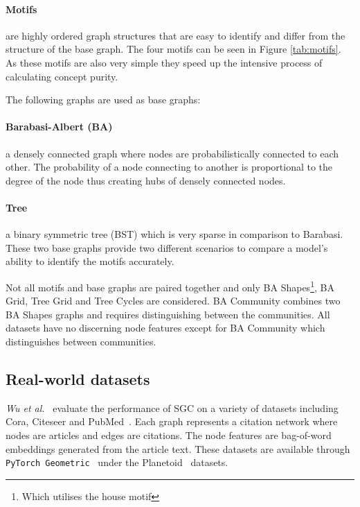 \paragraph{Motifs}

are highly ordered graph structures that are easy to identify and differ from the structure of the base graph.
The four motifs can be seen in Figure \ref{tab:motifs}.
As these motifs are also very simple they speed up the intensive process of calculating concept purity.

The following graphs are used as base graphs:

\paragraph{Barabasi-Albert (BA)}
a densely connected graph where nodes are probabilistically connected to each other.
The probability of a node connecting to another is proportional to the degree of the node thus creating hubs of densely connected nodes.

\paragraph{Tree}
a binary symmetric tree (BST) which is very sparse in comparison to Barabasi.
These two base graphs provide two different scenarios to compare a model's ability to identify the motifs accurately.

Not all motifs and base graphs are paired together and only BA Shapes\footnote{Which utilises the house motif}, BA Grid, Tree Grid and Tree Cycles are considered.
BA Community combines two BA Shapes graphs and requires distinguishing between the communities.
All datasets have no discerning node features except for BA Community which distinguishes between communities.

\subsection{Real-world datasets}
\label{sec:RWD}


\textit{Wu et al.}~\cite{wu2019simplifying} evaluate the performance of SGC on a variety of datasets including Cora, Citeseer and PubMed~\cite{citation}.
Each graph represents a citation network where nodes are articles and edges are citations.
The node features are bag-of-word embeddings generated from the article text.
These datasets are available through \texttt{PyTorch Geometric}~\cite{Fey/Lenssen/2019} under the Planetoid~\cite{planetoid} datasets.

